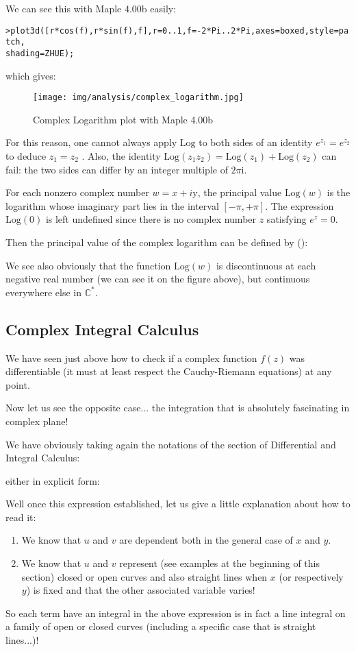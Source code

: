 	We can see this with Maple 4.00b easily:
	
	\texttt{>plot3d([r*cos(f),r*sin(f),f],r=0..1,f=-2*Pi..2*Pi,axes=boxed,style=patch,\\
	shading=ZHUE);}
	
	which gives:
	\begin{figure}[H]
		\begin{center}
			\texttt{[image: img/analysis/complex\_logarithm.jpg]}
		\end{center}	
		\caption{Complex Logarithm plot with Maple 4.00b}
	\end{figure}
	
	For this reason, one cannot always apply $\text{Log}$ to both sides of an identity $e^{z_1}=e^{z_2}$ to deduce $z_1=z_2$ . Also, the identity $\text{Log} (z_1z_2)= \text{Log}(z_1) + \text{Log}(z_2)$ can fail: the two sides can differ by an integer multiple of $2\pi \mathrm{i}$.
	
	For each nonzero complex number $w = x + i\mathrm{y}$, the principal value $\text{Log}(w)$ is the logarithm whose imaginary part lies in the interval $[-\pi,+\pi]$. The expression $\text{Log}(0)$ is left undefined since there is no complex number $z$ satisfying $e^z = 0$.
	
	Then the principal value of the complex logarithm can be defined by ():
	
	We see also obviously that the function $\text{Log}(w)$ is discontinuous at each negative real number (we can see it on the figure above), but continuous everywhere else in $\mathbb{C}^*$.
	
	\subsection{Complex Integral Calculus}
	We have seen just above how to check if a complex function $f (z)$ was differentiable (it must at least respect the Cauchy-Riemann equations) at any point.
	
	Now let us see the opposite case... the integration that is absolutely fascinating in complex plane!
	
	We have obviously taking again the notations of the section of Differential and Integral Calculus:
	
	either in explicit form:
	
	Well once this expression established, let us give a little explanation about how to read it:
	\begin{enumerate}
		\item We know that $u$ and $v$ are dependent both in the general case of $x$ and $y$.
		
		\item We know that $ u $ and $ v $ represent (see examples at the beginning of this section) closed or open curves and also straight lines when $ x $ (or respectively $y$) is fixed and that the other associated variable varies!
	\end{enumerate}
	So each term have an integral in the above expression is in fact a line integral on a family of open or closed curves (including a specific case that is straight lines...)!
	
